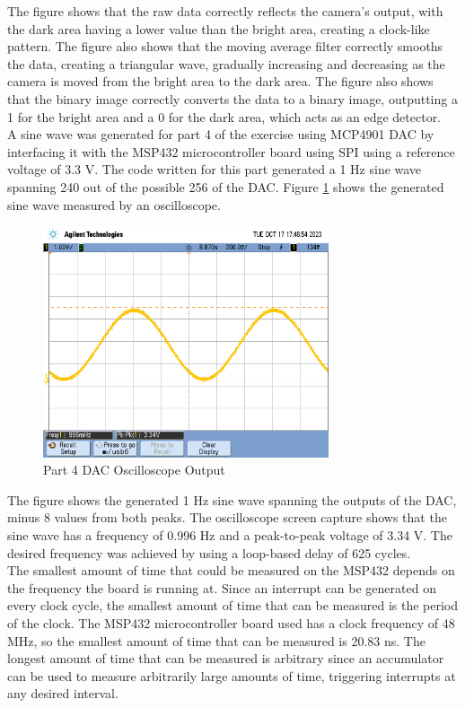 \documentclass[CMPE]{KGCOEReport}
\begin{document}
The figure shows that the raw data correctly reflects the camera's output, with the dark area having a lower value than the bright area, creating a clock-like pattern. The figure also shows that the moving average filter correctly smooths the data, creating a triangular wave, gradually increasing and decreasing as the camera is moved from the bright area to the dark area. The figure also shows that the binary image correctly converts the data to a binary image, outputting a 1 for the bright area and a 0 for the dark area, which acts as an edge detector.\\

A sine wave was generated for part 4 of the exercise using MCP4901 DAC by interfacing it with the MSP432 microcontroller board using SPI using a reference voltage of 3.3 V. The code written for this part generated a 1 Hz sine wave spanning 240 out of the possible 256 of the DAC. Figure \ref{fig:part4} shows the generated sine wave measured by an oscilloscope.

\begin{figure}[H]
    \centering
    \includegraphics[width=0.75\textwidth]{part4.png}
    \caption{Part 4 DAC Oscilloscope Output}
    \label{fig:part4}
\end{figure}

The figure shows the generated 1 Hz sine wave spanning the outputs of the DAC, minus 8 values from both peaks. The oscilloscope screen capture shows that the sine wave has a frequency of 0.996 Hz and a peak-to-peak voltage of 3.34 V. The desired frequency was achieved by using a loop-based delay of 625 cycles.\\

The smallest amount of time that could be measured on the MSP432 depends on the frequency the board is running at. Since an interrupt can be generated on every clock cycle, the smallest amount of time that can be measured is the period of the clock. The MSP432 microcontroller board used has a clock frequency of 48 MHz, so the smallest amount of time that can be measured is 20.83 ns. The longest amount of time that can be measured is arbitrary since an accumulator can be used to measure arbitrarily large amounts of time, triggering interrupts at any desired interval.\\
\end{document}
